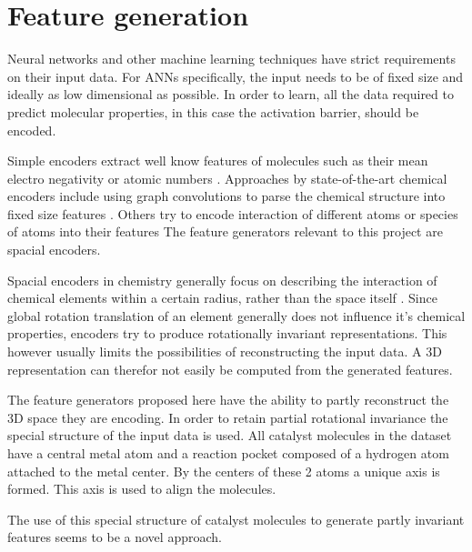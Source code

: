
\chapter{Feature generation}
\label{ch:features}
Neural networks and other machine learning techniques have strict requirements on their input data.
For ANNs specifically, the input needs to be of fixed size and ideally as low dimensional as possible.
In order to learn, all the data required to predict molecular properties, in this case the activation barrier, should be encoded.

Simple encoders extract well know features of molecules such as their mean electro negativity or atomic numbers \cite{LO20181538}.
Approaches by state-of-the-art chemical encoders include using graph convolutions to parse the chemical structure into fixed size features \cite{GNN_ENCODER}.
Others try to encode interaction of different atoms or species of atoms into their features \cite{PhysRevLett.108.058301}
The feature generators relevant to this project are spacial encoders.

Spacial encoders in chemistry generally focus on describing the interaction of chemical elements within a certain radius, rather 
than the space itself \cite{Bart_k_2013}.
Since global rotation translation of an element generally does not influence it's chemical properties, 
encoders try to produce rotationally invariant representations.
This however usually limits the possibilities of reconstructing the input data.
A 3D representation can therefor not easily be computed from the generated features.

The feature generators proposed here have the ability to partly reconstruct the 3D space they are encoding.
In order to retain partial rotational invariance the special structure of the input data is used.
All catalyst molecules in the dataset have a central metal atom and a reaction pocket composed of a hydrogen atom attached to the metal center.
By the centers of these 2 atoms a unique axis is formed.
This axis is used to align the molecules.

The use of this special structure of catalyst molecules to generate partly invariant features seems to be a novel approach.

